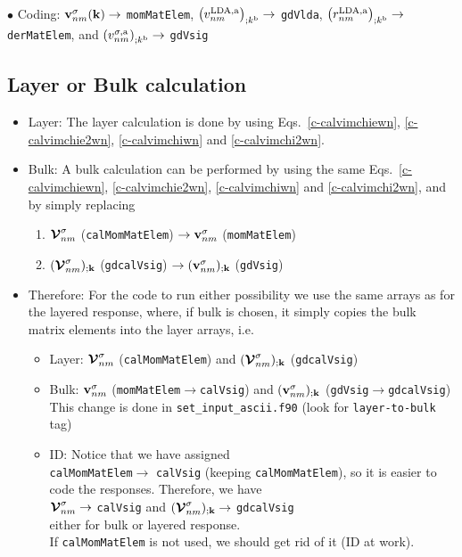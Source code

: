 $\bullet$ Coding:
$\mathbf{v}^\sigma_{nm}(\mathbf{k})\to$ \verb=momMatElem=,
$\left(v^{\mathrm{LDA},\mathrm{a}}_{nm}\right)_{;k^{\mathrm{b}}}\to$ \verb=gdVlda=,
$\left(r^{\mathrm{LDA},\mathrm{a}}_{nm}\right)_{;k^{\mathrm{b}}}\to$ \verb=derMatElem=, and
$\left(v^{\sigma,\mathrm{a}}_{nm}\right)_{;k^{\mathrm{b}}}\to$ \verb=gdVsig=

\subsection{Layer or Bulk calculation}
\begin{itemize}
\item Layer: The layer calculation is done by using
Eqs.~\eqref{c-calvimchiewn}, \eqref{c-calvimchie2wn}, \eqref{c-calvimchiwn}
 and \eqref{c-calvimchi2wn}. 
\item Bulk:
A bulk calculation can be performed by using the same
Eqs.~\eqref{c-calvimchiewn}, \eqref{c-calvimchie2wn}, \eqref{c-calvimchiwn}
 and \eqref{c-calvimchi2wn}, and by simply replacing
\begin{enumerate}
\item $\boldsymbol{\mathcal{\cal V}}^\sigma_{nm}$ (\verb=calMomMatElem=) $\to \mathbf{v}^\sigma_{nm}$ (\verb=momMatElem=) 
\item $(\boldsymbol{\mathcal{\cal V}}^\sigma_{nm})_{;\mathbf{k}}$ (\verb=gdcalVsig=) $\to
  (\mathbf{v}^\sigma_{nm})_{;\mathbf{k}}$ (\verb=gdVsig=) 
\end{enumerate}
\item Therefore: For the code to run either possibility we use the
  same arrays as for the layered response, where, if bulk is chosen, it
  simply copies the bulk matrix elements into the layer arrays, i.e.
\begin{itemize}
\item Layer: 
$\boldsymbol{\mathcal{\cal V}}^\sigma_{nm}$ (\verb=calMomMatElem=) and
$(\boldsymbol{\mathcal{\cal V}}^\sigma_{nm})_{;\mathbf{k}}$ (\verb=gdcalVsig=) 
\item Bulk:
$\mathbf{v}^\sigma_{nm}$ (\verb=momMatElem=$\to$\verb=calVsig=) and
$(\mathbf{v}^\sigma_{nm})_{;\mathbf{k}}$ (\verb=gdVsig=$\to$\verb=gdcalVsig=) \\
This change is done in \verb=set_input_ascii.f90= (look for
\verb=layer-to-bulk= tag)
\item ID: Notice that we have assigned\\
  \verb=calMomMatElem=$\to$ \verb=calVsig= (keeping
  \verb=calMomMatElem=), so it is easier to  code the responses.
Therefore, we have\\
$\boldsymbol{\mathcal{\cal V}}^\sigma_{nm}\to$ \verb=calVsig= and
$(\boldsymbol{\mathcal{\cal V}}^\sigma_{nm})_{;\mathbf{k}}\to$ \verb=gdcalVsig=\\
either for bulk or layered response. \\
If \verb=calMomMatElem= is not used, we should get rid of it (ID at work).
\end{itemize}
\end{itemize}

